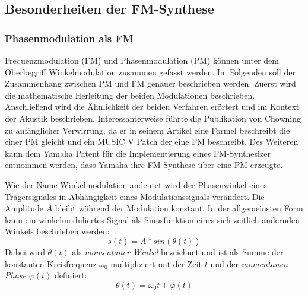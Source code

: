 \subsection{Besonderheiten der FM-Synthese}
\FloatBarrier
\subsubsection{Phasenmodulation als FM}
Frequenzmodulation (FM) und Phasenmodulation (PM) können unter dem Oberbegriff Winkelmodulation zusammen gefasst werden. Im Folgenden soll der Zusammenhang zwischen PM und FM genauer beschrieben werden. Zuerst wird die mathematische Herleitung der beiden Modulationen beschrieben. Anschließend wird die Ähnlichkeit der beiden Verfahren erörtert und im Kontext der Akustik beschrieben. Interessanterweise führte die Publikation von Chowning zu anfänglicher Verwirrung, da er in seinem Artikel eine Formel beschreibt die einer PM gleicht und ein MUSIC V Patch der eine FM beschreibt. \cite{rossum1999method} Des Weiteren kann dem Yamaha Patent für die Implementierung eines FM-Synthesizer entnommen werden, dass Yamaha ihre FM-Synthese über eine PM erzeugte. \cite{oya1987electronic} 

Wie der Name Winkelmodulation andeutet wird der Phasenwinkel eines Trägersignales in Abhängigkeit eines Modulationssignals verändert. Die Amplitude \(A\) bleibt während der Modulation konstant. In der allgemeinsten Form kann ein winkelmoduliertes Signal als Sinusfunktion eines sich zeitlich ändernden Winkels beschrieben werden:
\begin{equation}
s(t)=A*sin(\theta(t))
\label{eq:signal_basis_funktion}
\end{equation}
Dabei wird \(\theta(t)\) als \textit{momentaner Winkel} bezeichnet und ist als Summe der konstanten Kreisfrequenz $\omega_0$ multipliziert mit der Zeit $t$ und der \textit{momentanen Phase} $\varphi(t)$ definiert:
\begin{equation*}
\theta(t)=\omega_0t + \varphi(t)
\end{equation*}

